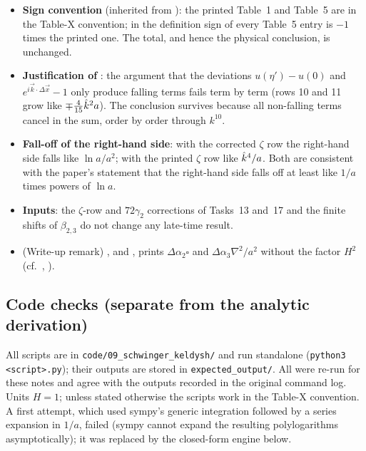 \begin{discbox}
\begin{itemize}[leftmargin=12pt,itemsep=2pt]
\item \textbf{Sign convention} (inherited from \PI): the printed Table~1 and Table~5 are in the Table-X convention; in the definition sign of  every Table~5 entry is $-1$ times the printed one.
The total, and hence the physical conclusion, is unchanged.
\item \textbf{Justification of }: the argument that the deviations $u(\eta')-u(0)$ and $e^{i\vec k\cdot\Delta\vec x}-1$ only produce falling terms fails term by term
(rows 10 and 11 grow like $\mp\frac4{15}\hat k^2a$). The conclusion survives because all non-falling terms cancel in the sum, order by order through $k^{10}$.
\item \textbf{Fall-off of the right-hand side}: with the corrected $\zeta$ row the right-hand side falls like $\ln a/a^2$; with the printed $\zeta$ row like $\hat k^4/a$.
Both are consistent with the paper's statement that the right-hand side falls off at least like $1/a$ times powers of $\ln a$.
\item \textbf{Inputs}: the $\zeta$-row and $72\gamma_2$ corrections of Tasks~13 and~17 and the finite shifts of $\beta_{2,3}$ do not change any late-time result.
\item (Write-up remark) \PII,  and , prints $\Delta\alpha_2\square$ and $\Delta\alpha_3\nabla^2/a^2$ without the factor $H^2$ (cf.\ , ).
\end{itemize}
\end{discbox}

\subsection{Code checks (separate from the analytic derivation)}
\label{sec:t18-code}

All scripts are in \texttt{code/09\_schwinger\_keldysh/} and run standalone (\texttt{python3 <script>.py}); their outputs are stored in \texttt{expected\_output/}.
All were re-run for these notes and agree with the outputs recorded in the original command log. Units $H=1$; unless stated otherwise the scripts work in the Table-X convention.
A first attempt, which used sympy's generic integration followed by a series expansion in $1/a$, failed (sympy cannot expand the resulting polylogarithms asymptotically);
it was replaced by the closed-form engine below.

